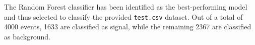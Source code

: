   The Random Forest classifier has been identified as the best-performing model and thus selected to classify the 
  provided \texttt{test.csv} dataset. Out of a total of 4000 events, 1633 are classified as signal, while the remaining 2367 
  are classified as background.
